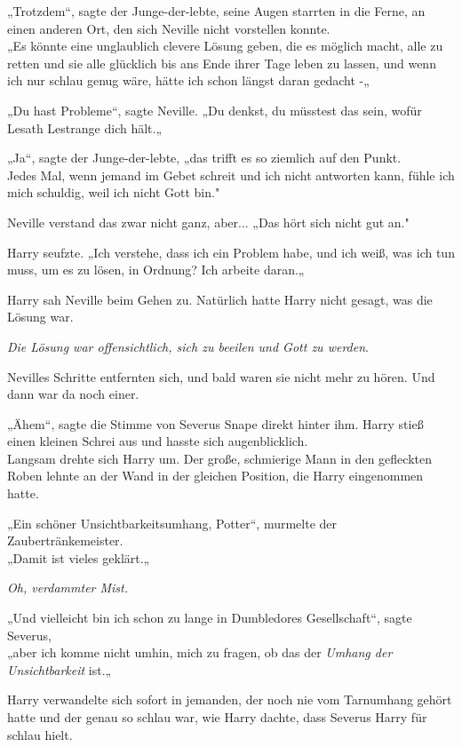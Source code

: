 {„Trotzdem“, sagte der Junge-der-lebte, seine Augen starrten in die Ferne, an einen anderen Ort, den sich Neville nicht vorstellen konnte.\\ „Es könnte eine unglaublich clevere Lösung geben, die es möglich macht, alle zu retten und sie alle glücklich bis ans Ende ihrer Tage leben zu lassen, und wenn ich nur schlau genug wäre, hätte ich schon längst daran gedacht -„

„Du hast Probleme“, sagte Neville. „Du denkst, du müsstest das sein, wofür Lesath Lestrange dich hält.„

„Ja“, sagte der Junge-der-lebte, „das trifft es so ziemlich auf den Punkt.\\ Jedes Mal, wenn jemand im Gebet schreit und ich nicht antworten kann, fühle ich mich schuldig, weil ich nicht Gott bin."

Neville verstand das zwar nicht ganz, aber... „Das hört sich nicht gut an."

Harry seufzte. „Ich verstehe, dass ich ein Problem habe, und ich weiß, was ich tun muss, um es zu lösen, in Ordnung? Ich arbeite daran.„

Harry sah Neville beim Gehen zu. Natürlich hatte Harry nicht gesagt, was die Lösung war.

\emph{Die Lösung war offensichtlich, sich zu beeilen und Gott zu werden}.

Nevilles Schritte entfernten sich, und bald waren sie nicht mehr zu hören. Und dann war da noch einer.

„Ähem“, sagte die Stimme von Severus Snape direkt hinter ihm. Harry stieß einen kleinen Schrei aus und hasste sich augenblicklich.\\ Langsam drehte sich Harry um. Der große, schmierige Mann in den gefleckten Roben lehnte an der Wand in der gleichen Position, die Harry eingenommen hatte.

„Ein schöner Unsichtbarkeitsumhang, Potter“, murmelte der Zaubertränkemeister.\\ „Damit ist vieles geklärt.„

\emph{Oh, verdammter Mist.}

„Und vielleicht bin ich schon zu lange in Dumbledores Gesellschaft“, sagte Severus,\\ „aber ich komme nicht umhin, mich zu fragen, ob das der \emph{Umhang der Unsichtbarkeit} ist.„

Harry verwandelte sich sofort in jemanden, der noch nie vom Tarnumhang gehört hatte und der genau so schlau war, wie Harry dachte, dass Severus Harry für schlau hielt.

}

